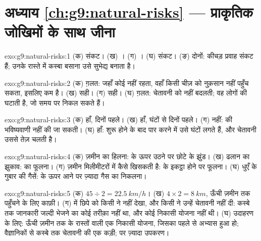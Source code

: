 \section*{अध्याय \ref{ch:g9:natural-risks} --- प्राकृतिक जोखिमों के साथ जीना}

\begin{solution}{exo:g9:natural-risks:1}
(क) संकट। (ख) । (ग) । (घ) संकट। (ङ) दोनों: कीचड़ प्रवाह संकट हैं;
उनके रास्ते में कस्बा बसाना उसे सुभेद्य बनाता
है।
\end{solution}

\begin{solution}{exo:g9:natural-risks:2}
(क) ग़लत: जहाँ कोई नहीं रहता, वहाँ किसी चीज़ को नुक़सान नहीं पहुँच सकता, इसलिए  कम है।
(ख) सही। (ग) सही। (घ) ग़लत: चेतावनी  को नहीं बदलती; वह लोगों की 
घटाती है, जो समय पर निकल सकते हैं।
\end{solution}

\begin{solution}{exo:g9:natural-risks:3}
(क) हाँ, दिनों पहले। (ख) हाँ, घंटों से दिनों पहले। (ग) नहीं:  की भविष्यवाणी नहीं
की जा सकती। (घ) हाँ:  शुरू होने के बाद  पार करने में उसे घंटों लगते हैं, और
चेतावनी उससे तेज़ चलती है।
\end{solution}

\begin{solution}{exo:g9:natural-risks:4}
(क) ज़मीन का हिलना:  के ऊपर उठने पर छोटे  के झुंड। (ख) ढलान का झुकाव:
 का फूलना। (ग) ज़मीन मिलीमीटरों में कैसे खिसकती है:  के इकट्ठा होने पर
फूलना। (घ) धुएँ के गुबार की गैसें:  के ऊपर आने पर ज़्यादा गैस का
निकलना।
\end{solution}

\begin{solution}{exo:g9:natural-risks:5}
(क) $45 \div 2 = \qty{22.5}{km/h}$। (ख) $4 \times 2 = \qty{8}{km}$, ऊँची ज़मीन तक
पहुँचने के लिए काफ़ी। (ग)  में छिपे  को किसी ने नहीं देखा, और किसी ने उन्हें
चेतावनी नहीं दी: कस्बे तक जानकारी जल्दी भेजने का कोई तरीक़ा नहीं था, और कोई निकासी योजना
नहीं थी। (घ) उदाहरण के लिए: ऊँची ज़मीन तक के रास्तों वाली एक निकासी योजना, जिसका पहले से
अभ्यास हुआ हो; वैज्ञानिकों से कस्बे तक चेतावनी की एक कड़ी;  पर ज़्यादा
उपकरण।
\end{solution}

